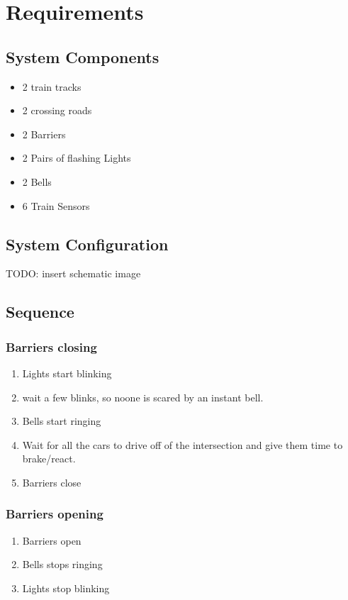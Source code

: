 \documentclass[final]{scrreprt} %
\begin{document}
\chapter{Requirements}

\section{System Components}
\begin{itemize}
\item 2 train tracks
\item 2 crossing roads
\item 2 Barriers
\item 2 Pairs of flashing Lights
\item 2 Bells
\item 6 Train Sensors
\end{itemize}
\section{System Configuration}
TODO: insert schematic image
\section{Sequence}

\subsection{Barriers closing}
\begin{enumerate}
\item Lights start blinking
\item wait a few blinks, so noone is scared by an instant bell. %
\item Bells start ringing
\item Wait for all the cars to drive off of the intersection and give them time to brake/react.
\item Barriers close
\end{enumerate}

\subsection{Barriers opening}
\begin{enumerate}
\item Barriers open
\item Bells stops ringing
\item Lights stop blinking
\end{enumerate}
\end{document}
